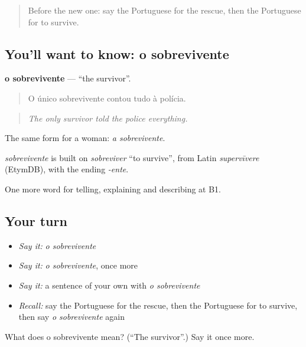 \label{lesson:PT-C306-sobrevivente}



\begin{quote}
Before the new one: say the Portuguese for the rescue, then the Portuguese for to survive.
\end{quote}

\subsection*{You'll want to know: o sobrevivente}
\textbf{o sobrevivente} — \textquotedblleft{}the survivor\textquotedblright{}.

\begin{quote}
O único sobrevivente contou tudo à polícia.
\end{quote}

\begin{quote}
\emph{The only survivor told the police everything.}
\end{quote}

The same form for a woman: \emph{a sobrevivente}.

\begin{cousinweb}
\emph{sobrevivente} is built on \emph{sobreviver} \textquotedblleft{}to survive\textquotedblright{}, from Latin \emph{supervīvere} (EtymDB), with the ending \emph{-ente}.
\end{cousinweb}

\begin{grammarlens}[title={What you've built}]
One more word for telling, explaining and describing at B1.
\end{grammarlens}

\subsection*{Your turn}
\begin{itemize}
\raggedright
  \item \emph{Say it:} \emph{o sobrevivente}
  \item \emph{Say it:} \emph{o sobrevivente}, once more
  \item \emph{Say it:} a sentence of your own with \emph{o sobrevivente}
  \item \emph{Recall:} say the Portuguese for the rescue, then the Portuguese for to survive, then say \emph{o sobrevivente} again
\end{itemize}

\begin{tcolorbox}[breakable,colback=teal!4,colframe=teal!35!black,title={Before you move on}]
What does o sobrevivente mean? (\textquotedblleft{}The survivor\textquotedblright{}.) Say it once more.
\end{tcolorbox}
